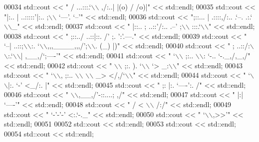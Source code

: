 \begin{DoxyCode}
00034 std::cout << \textcolor{stringliteral}{" /       ...:::.`\(\backslash\)\(\backslash\) ,/:..| |(o)  / /o)|"}          << std::endl;
00035 std::cout << \textcolor{stringliteral}{"|:..   |  ..:::::'|:..  ;\(\backslash\)\(\backslash\) `---'. `--'"}          << std::endl;
00036 std::cout << \textcolor{stringliteral}{";::... |   .::::,/:..    .`--.   .:.`\(\backslash\)\(\backslash\)\_"}         << std::endl;
00037 std::cout << \textcolor{stringliteral}{" |::.. ;  ..::'/:..   .--'    ;\(\backslash\)\(\backslash\)   :::.`\(\backslash\)\(\backslash\)"}      << std::endl;
00038 std::cout << \textcolor{stringliteral}{" ;::../   ..::|::.  /'          ;.  ':'.---."}     << std::endl;
00039 std::cout << \textcolor{stringliteral}{"  `--|    ..::;\(\backslash\)\(\backslash\):.  `\(\backslash\)\(\backslash\),,,\_\_\_\_,,,/';\(\backslash\)\(\backslash\). (\_)  |)"} << std::endl;
00040 std::cout << \textcolor{stringliteral}{"     ;     ..::/:\(\backslash\)\(\backslash\):.`\(\backslash\)\(\backslash\)|         ,\_\_,/`;----'"}   << std::endl;
00041 std::cout << \textcolor{stringliteral}{"     `\(\backslash\)\(\backslash\)       ;:.. \(\backslash\)\(\backslash\): `-..      `-.\_,/,\_,/"}     << std::endl;
00042 std::cout << \textcolor{stringliteral}{"       \(\backslash\)\(\backslash\)      ;:.   ). `\(\backslash\)\(\backslash\) `>     \_:\(\backslash\)\(\backslash\)"}          << std::endl;
00043 std::cout << \textcolor{stringliteral}{"        `\(\backslash\)\(\backslash\),  ;:..    \(\backslash\)\(\backslash\) \(\backslash\)\(\backslash\) \_>     </,/`\(\backslash\)\(\backslash\)"}       << std::endl;
00044 std::cout << \textcolor{stringliteral}{"           `\(\backslash\)\(\backslash\)|:.      `-'      <\_/:.  |"}         << std::endl;
00045 std::cout << \textcolor{stringliteral}{"             ;:     |:.  `----':.    /"}           << std::endl;
00046 std::cout << \textcolor{stringliteral}{"              \(\backslash\)\(\backslash\),\_\_,/'-::....;      ,/"}           << std::endl;
00047 std::cout << \textcolor{stringliteral}{"               |:|          `----'"}               << std::endl;
00048 std::cout << \textcolor{stringliteral}{"               / < \(\backslash\)\(\backslash\)          /:/"}               << std::endl;
00049 std::cout << \textcolor{stringliteral}{"              `-'-'-'        <:.`-.\_"}             << std::endl;
00050 std::cout << \textcolor{stringliteral}{"                               `\(\backslash\)\(\backslash\),>>'"}           << std::endl;
00051 
00052     std::cout << std::endl;
00053     std::cout << std::endl;
00054     std::cout << std::endl;

\end{DoxyCode}
